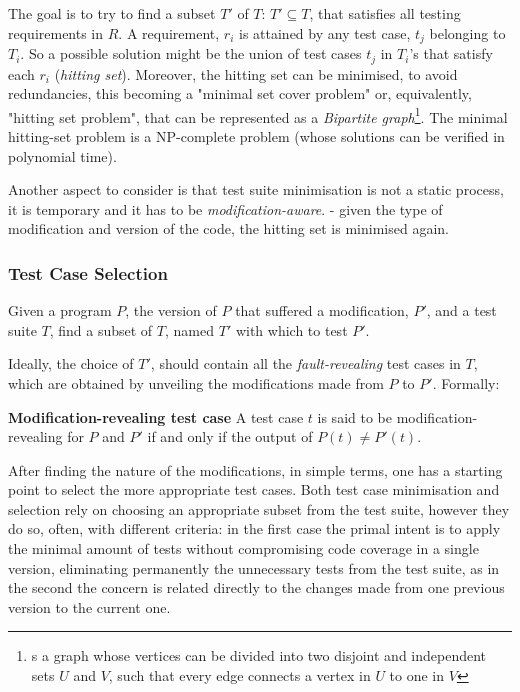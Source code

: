 The goal is to try to find a subset $T'$ of $T$: $T' \subseteq T$, that satisfies all testing requirements in $R$. A requirement, $r_i$ is attained by any test case, $t_j$ belonging to $T_i$. So a possible solution might be the union of test cases $t_j$ in $T_i$'s that satisfy each $r_i$ (\textit{hitting set}). Moreover, the hitting set can be minimised, to avoid redundancies, this becoming a "minimal set cover problem" or, equivalently, "hitting set problem", that can be represented as a \textit{Bipartite graph}\footnote{s a graph whose vertices can be divided into two disjoint and independent sets $U$ and $V$, such that every edge connects a vertex in $U$ to one in $V$\cite{NPcomplete}}. The minimal hitting-set problem is a NP-complete problem (whose solutions can be verified in polynomial time). \cite{NPcomplete} 
\par Another aspect to consider is that test suite minimisation is not a static process, it is temporary and  it has to be \textit{modification-aware}. - given the type of modification and version of the code, the hitting set is minimised again. \cite{ShinThesis}

\subsubsection{Test Case Selection}


\theoremstyle{definition}
\begin{definition}{}
	Given a program $P$, the version of $P$ that suffered a modification, $P'$, and a test suite $T$, find a subset of $T$, named $T'$ with which to test $P'$.
\end{definition}

Ideally, the choice of $T'$, should contain all the \textit{fault-revealing} test cases in $T$, which are obtained by unveiling the modifications made from $P$ to $P'$. Formally: 

\theoremstyle{definition}
\begin{definition}{\textbf{Modification-revealing test case}}
	A test case $t$ is said to be modification-revealing for $P$ and $P'$ if and only if the output of $P(t) \neq P'(t)$. \cite{Rothermel:1994:FER:257734.257767}
\end{definition}

After finding the nature of the modifications, in simple terms, one has a starting point to select the more appropriate test cases. Both test case minimisation and selection rely on choosing an appropriate subset from the test suite, however they do so, often, with different criteria: in the first case the primal intent is to apply the minimal amount of tests without compromising code coverage in a single version, eliminating permanently the unnecessary tests from the test suite, as in the second the concern is related directly to the changes made from one previous version to the current one. \cite{ShinThesis} 

